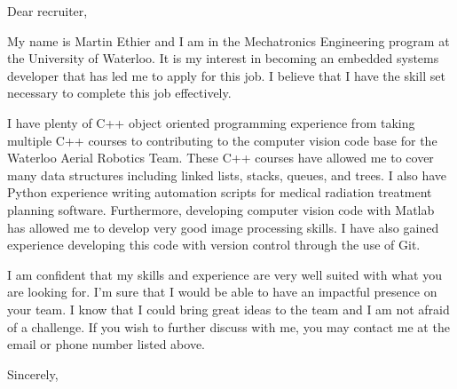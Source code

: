 \documentclass[]{deedy-resume-openfont}
\begin{document}
%
%


%
%
\sectionsep
\sectionsep
{}
\sectionsep
\sectionsep
{}

\sectionsep

\sectionsep

Dear recruiter,

\sectionsep

\sectionsep

My name is Martin Ethier and I am in the Mechatronics Engineering program at the University of Waterloo. It is my interest in becoming an embedded systems developer that has led me to apply for this job. I believe that I have the skill set necessary to complete this job effectively. 

\sectionsep
I have plenty of C++ object oriented programming experience from taking multiple C++ courses to contributing to the computer vision code base for the Waterloo Aerial Robotics Team. These C++ courses have allowed me to cover many data structures including linked lists, stacks, queues, and trees. I also have Python experience writing automation scripts for medical radiation treatment planning software. Furthermore, developing computer vision code with Matlab has allowed me to develop very good image processing skills. I have also gained experience developing this code with version control through the use of Git.

\sectionsep
I am confident that my skills and experience are very well suited with what you are looking for. I'm sure that I would be able to have an impactful presence on your team. I know that I could bring great ideas to the team and I am not afraid of a challenge. If you wish to further discuss with me, you may contact me at the email or phone number listed above.
\sectionsep

\sectionsep
Sincerely,
\sectionsep

\sectionsep

\end{document}
